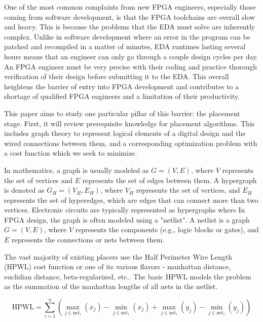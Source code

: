 \documentclass{article}
\begin{document}
One of the most common complaints from new FPGA engineers, especially those coming from software development, is that the FPGA toolchains are overall slow and heavy.
This is because the problems that the EDA must solve are inherently complex.
Unlike in software development where an error in the program can be patched and recompiled in a matter of minutes, EDA runtimes lasting several hours means that an engineer can only go through a couple design cycles per day. 
An FPGA engineer must be very precise with their coding and practice thorough verification of their design before submitting it to the EDA.
This overall heightens the barrier of entry into FPGA development and contributes to a shortage of qualified FPGA engineers and a limitation of their productivity. 

This paper aims to study one particular pillar of this barrier: the placement stage. 
First, it will review prerequisite knowledge for placement algorithms. 
This includes graph theory to represent logical elements of a digital design and the wired connections between them, and a corresponding optimization problem with a cost function which we seek to minimize. 

In mathematics, a graph is usually modeled as \( G = (V, E) \), where \( V \) represents the set of vertices and \( E \) represents the set of edges between them.
A hypergraph is denoted as \( G_{H} = (V_{H}, E_{H}) \), where \( V_{H} \) represents the set of vertices, and \( E_{H} \) represents the set of hyperedges, which are edges that can connect more than two vertices.
Electronic circuits are typically represented as hypergraphs where %
In FPGA design, the graph is often modeled using a "netlist". A netlist is a graph \( G = (V, E) \), where \( V \) represents the components (e.g., logic blocks or gates), and \( E \) represents the connections or nets between them.

The vast majority of existing placers use the Half Perimeter Wire Length (HPWL) cost function or one of its various flavors - manhattan distance, euclidian distance, beta-regularized, etc..
The basic HPWL models the problem as the summation of the manhattan lengths of all nets in the netlist. 


\begin{equation}
    \text{HPWL} = \sum_{i=1}^{n} \left( \max_{j \in \text{net}_i} (x_j) - \min_{j \in \text{net}_i} (x_j) + \max_{j \in \text{net}_i} (y_j) - \min_{j \in \text{net}_i} (y_j) \right)
\end{equation}
\end{document}
